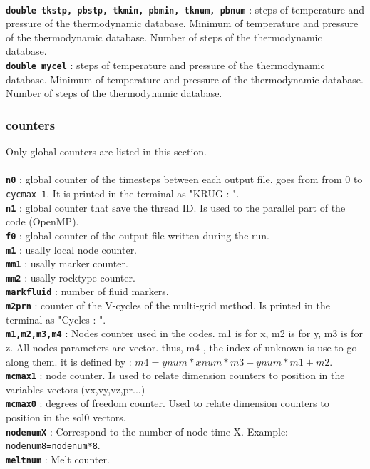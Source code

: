 \\
\textbf{\texttt{double tkstp, pbstp, tkmin, pbmin, tknum, pbnum}} : steps of temperature and pressure of the thermodynamic database. Minimum of temperature and pressure of the thermodynamic database. Number of steps of the thermodynamic database.
\\
\textbf{\texttt{double mycel}} : steps of temperature and pressure of the thermodynamic database. Minimum of temperature and pressure of the thermodynamic database. Number of steps of the thermodynamic database.
\\

\subsubsection{counters}
Only global counters are listed in this section.
\\
\\
\textbf{\texttt{n0}} : global counter of the timesteps between each output file. goes from from 0 to \texttt{cycmax-1}. It is printed in the terminal as "KRUG : ".
\\
\textbf{\texttt{n1}} : global counter that save the thread ID. Is used to the parallel part of the code (OpenMP).
\\
\textbf{\texttt{f0}} : global counter of the output file written during the run.
\\
\textbf{\texttt{m1}} : usally local node counter.
\\
\textbf{\texttt{mm1}} : usally marker counter.
\\
\textbf{\texttt{mm2}} : usally rocktype counter.
\\
\textbf{\texttt{markfluid}} : number of fluid markers.
\\
\textbf{\texttt{m2prn}} : counter of the V-cycles of the multi-grid method. Is printed in the terminal as "Cycles : ". 
\\
\textbf{\texttt{m1,m2,m3,m4}} : Nodes counter used in the codes. m1 is for x, m2 is for y, m3 is for z. All nodes parameters are vector. thus, m4 , the index of unknown is use to go along them. it is defined by : $m4 = ynum*xnum*m3 + ynum*m1 + m2$.
\\
\textbf{\texttt{mcmax1}} : node counter. Is used to relate dimension counters to position in the variables vectors (vx,vy,vz,pr...)
\\
\textbf{\texttt{mcmax0}} : degrees of freedom counter. Used to relate dimension counters to position in the sol0 vectors.
\\
\textbf{\texttt{nodenumX}} :  Correspond to the number of node time X. Example: \texttt{nodenum8=nodenum*8}.
\\
\textbf{\texttt{meltnum}} :  Melt counter.
\\

